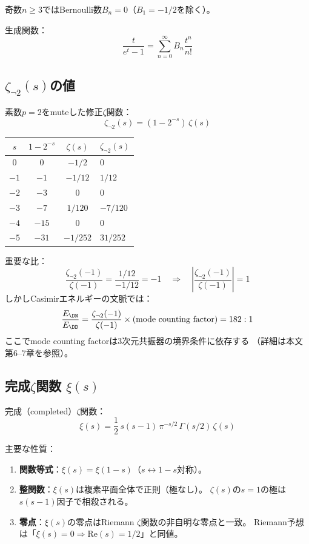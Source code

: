 \noindent
奇数$n \geq 3$ではBernoulli数$B_n = 0$（$B_1 = -1/2$を除く）。

生成関数：
\[
\frac{t}{e^t - 1} = \sum_{n=0}^{\infty} B_n \frac{t^n}{n!}
\]


\subsection{$\zeta_{\neg 2}(s)$の値}

素数$p = 2$をmuteした修正$\zeta$関数：
\[
\zeta_{\neg 2}(s) = (1 - 2^{-s})\,\zeta(s)
\]

\begin{center}
\begin{tabular}{cccl}
\toprule
$s$ & $1 - 2^{-s}$ & $\zeta(s)$ & $\zeta_{\neg 2}(s)$ \\
\midrule
$0$ & $0$ & $-1/2$ & $0$ \\
$-1$ & $-1$ & $-1/12$ & $1/12$ \\
$-2$ & $-3$ & $0$ & $0$ \\
$-3$ & $-7$ & $1/120$ & $-7/120$ \\
$-4$ & $-15$ & $0$ & $0$ \\
$-5$ & $-31$ & $-1/252$ & $31/252$ \\
\bottomrule
\end{tabular}
\end{center}

\noindent
重要な比：
\[
\frac{\zeta_{\neg 2}(-1)}{\zeta(-1)} = \frac{1/12}{-1/12} = -1
\quad\Longrightarrow\quad
\left|\frac{\zeta_{\neg 2}(-1)}{\zeta(-1)}\right| = 1
\]
しかしCasimirエネルギーの文脈では：
\[
\frac{E_{\DN}}{E_{\DD}} = \frac{\zeta_{\neg 2}(-1)}{\zeta(-1)}
\times (\text{mode counting factor}) = 182:1
\]
ここでmode counting factorは3次元共振器の境界条件に依存する
（詳細は本文第6--7章を参照）。


\subsection{完成$\zeta$関数 $\xi(s)$}

完成（completed）$\zeta$関数：
\[
\xi(s) = \frac{1}{2}\,s(s-1)\,\pi^{-s/2}\,\Gamma(s/2)\,\zeta(s)
\]

主要な性質：
\begin{enumerate}
\item \textbf{関数等式}：$\xi(s) = \xi(1-s)$（$s \leftrightarrow 1-s$対称）。
\item \textbf{整関数}：$\xi(s)$は複素平面全体で正則（極なし）。
$\zeta(s)$の$s = 1$の極は$s(s-1)$因子で相殺される。
\item \textbf{零点}：$\xi(s)$の零点はRiemann $\zeta$関数の非自明な零点と一致。
Riemann予想は「$\xi(s) = 0 \Rightarrow \mathrm{Re}(s) = 1/2$」と同値。
\end{enumerate}

